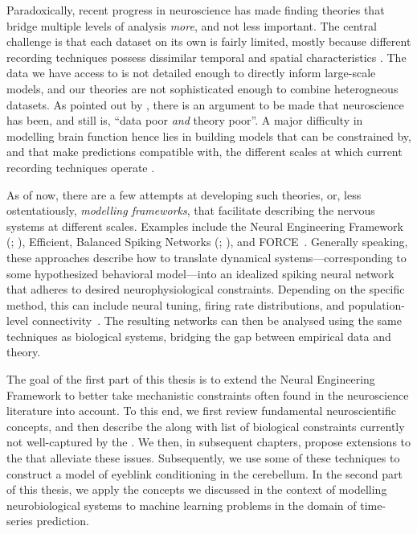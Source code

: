 Paradoxically, recent progress in neuroscience has made finding theories that bridge multiple levels of analysis \emph{more}, and not less important.
The central challenge is that each dataset on its own is fairly limited, mostly because different recording techniques possess dissimilar temporal and spatial characteristics \citep{sejnowski2014putting}.
The data we have access to is not detailed enough to directly inform large-scale models, and our theories are not sophisticated enough to combine heterogneous datasets. As pointed out by \citet{churchland1992computational}, there is an argument to be made that neuroscience has been, and still is, \enquote{data poor \emph{and} theory poor}.
A major difficulty in modelling brain function hence lies in building models that can be constrained by, and that make predictions compatible with, the different scales at which current recording techniques operate \citep[Chapter~9]{eliasmith2013how}.

As of now, there are a few attempts at developing such theories, or, less ostentatiously, \emph{modelling frameworks}, that facilitate describing the nervous systems at different scales.
Examples include the Neural Engineering Framework (\NEF; \cite{eliasmith2003neural}), Efficient, Balanced Spiking Networks (\EBN; \cite{boerlin2011spikebased,boerlin2013predictive}), and FORCE~\citep{sussillo2009generating,nicola2017supervised}.
Generally speaking, these approaches describe how to translate dynamical systems---corresponding to some hypothesized behavioral model---into an idealized spiking neural network that adheres to desired neurophysiological constraints.
Depending on the specific method, this can include neural tuning, firing rate distributions, and population-level connectivity~\citep{komer2016unified,nicola2017supervised}.
The resulting networks can then be analysed using the same techniques as biological systems, bridging the gap between empirical data and theory.

The goal of the first part of this thesis is to extend the Neural Engineering Framework to better take mechanistic constraints often found in the neuroscience literature into account.
To this end, we first review fundamental neuroscientific concepts, and then describe the \NEF along with list of biological constraints currently not well-captured by the \NEF.
We then, in subsequent chapters, propose extensions to the \NEF that alleviate these issues.
Subsequently, we use some of these techniques to construct a model of eyeblink conditioning in the cerebellum.
In the second part of this thesis, we apply the concepts we discussed in the context of modelling neurobiological systems to machine learning problems in the domain of time-series prediction.
